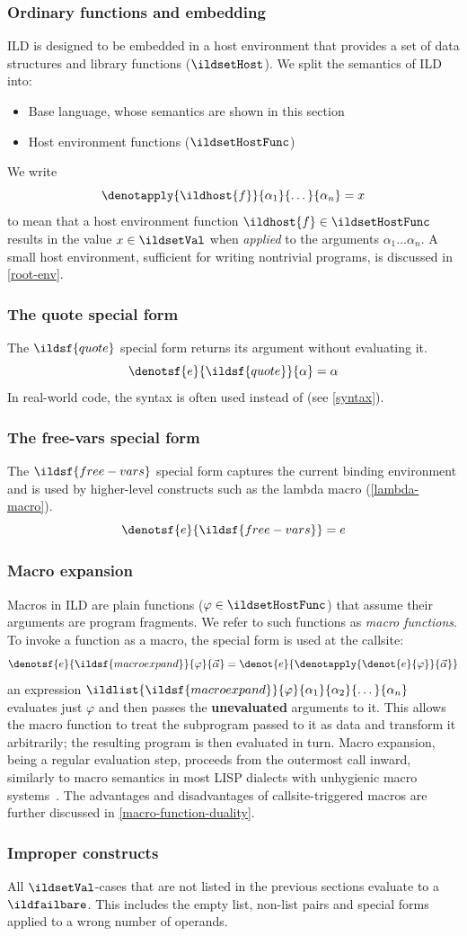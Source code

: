 \subsubsection{Ordinary functions and embedding}
\label{embedding}
ILD is designed to be embedded in a host environment that provides a set of data structures
and library functions (\(\ildsetHost\)). We split the semantics of ILD into:
\begin{itemize}
  \item Base language, whose semantics are shown in this section
  \item Host environment functions (\(\ildsetHostFunc\))
\end{itemize}
We write
\[ \denotapply{\ildhost{f}}{\alpha_1}{\dots}{\alpha_n} = x \]
to mean that a host environment function \(\ildhost{f} \in \ildsetHostFunc\) results in the
value \(x \in \ildsetVal\) when \emph{applied} to the arguments \(\alpha_1 \dots \alpha_n\).
A small host environment,
sufficient for writing nontrivial programs, is discussed in \cref{root-env}.
\subsubsection{The quote special form}
The \(\ildsf{quote}\) special form returns its argument without evaluating it.
  \[
    \denotsf{e}{\ildsf{quote}}{\alpha} = \alpha
  \]
In real-world code, the  syntax is often used instead of
 (see \cref{syntax}).
\subsubsection{The free-vars special form}
The \(\ildsf{free-vars}\) special form captures the current binding environment and is used by higher-level constructs
such as the lambda macro (\cref{lambda-macro}).
  \[
    \denotsf{e}{\ildsf{free-vars}} = e
  \]
\subsubsection{Macro expansion}
\label{macroexpand-mechanism}
Macros in ILD are plain functions (\(\varphi \in \ildsetHostFunc\)) that assume their arguments
are program fragments. We refer to such functions as \emph{macro functions}.
To invoke a function as a macro, the special form
 is used at the callsite:
\[
  \denotsf{e}{\ildsf{macroexpand}}{\varphi}{\vec{\alpha}}
  = \denot{e}{\denotapply{\denot{e}{\varphi}}{\vec{\alpha}}}
\]
an expression
\(\ildlist{\ildsf{macroexpand}}{\varphi}{\alpha_1}{\alpha_2}{\dots}{\alpha_n}\)
evaluates just \(\varphi\) and then passes the
\textbf{unevaluated} arguments to it. This allows the macro function to treat the subprogram
passed to it as data and transform it arbitrarily; the resulting program is then
evaluated in turn. Macro expansion, being a regular evaluation step,
proceeds from the outermost call inward, similarly to macro semantics
in most LISP dialects with unhygienic macro systems~\cite{steele-gabriel-evolution,kohlbecker1986syntactic}.
The advantages and disadvantages of callsite-triggered macros are further
discussed in \cref{macro-function-duality}.
\subsubsection{Improper constructs}
All \(\ildsetVal\)-cases that are not listed in the previous sections evaluate
to a \(\ildfailbare\). This includes the empty list, non-list pairs and special forms
applied to a wrong number of operands.
